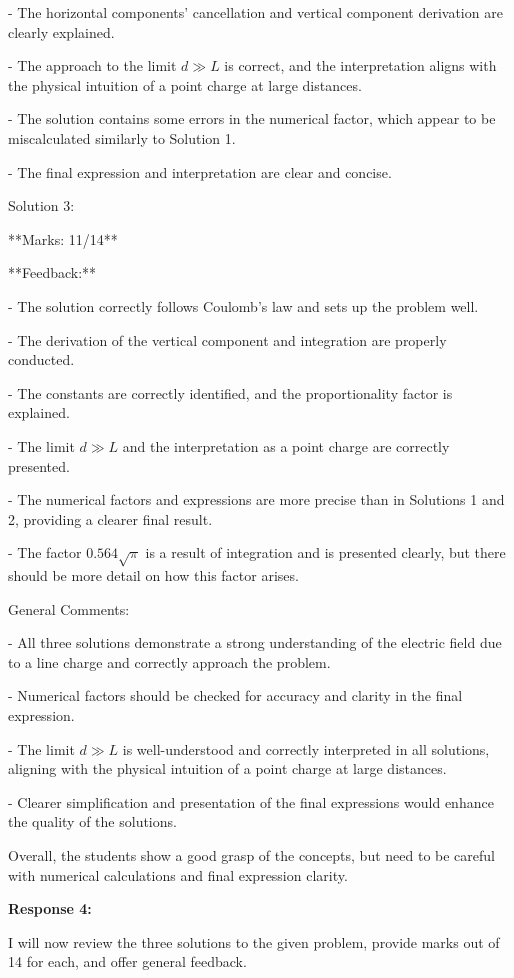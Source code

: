 \documentclass[a4paper,11pt]{article}
\begin{document}
- The horizontal components' cancellation and vertical component derivation are clearly explained.

- The approach to the limit \( d \gg L \) is correct, and the interpretation aligns with the physical intuition of a point charge at large distances.

- The solution contains some errors in the numerical factor, which appear to be miscalculated similarly to Solution 1.

- The final expression and interpretation are clear and concise.

Solution 3:

**Marks: 11/14**

**Feedback:**

- The solution correctly follows Coulomb's law and sets up the problem well.

- The derivation of the vertical component and integration are properly conducted.

- The constants are correctly identified, and the proportionality factor is explained.

- The limit \( d \gg L \) and the interpretation as a point charge are correctly presented.

- The numerical factors and expressions are more precise than in Solutions 1 and 2, providing a clearer final result.

- The factor \( 0.564 \sqrt{\pi} \) is a result of integration and is presented clearly, but there should be more detail on how this factor arises.

General Comments:

- All three solutions demonstrate a strong understanding of the electric field due to a line charge and correctly approach the problem.

- Numerical factors should be checked for accuracy and clarity in the final expression.

- The limit \( d \gg L \) is well-understood and correctly interpreted in all solutions, aligning with the physical intuition of a point charge at large distances.

- Clearer simplification and presentation of the final expressions would enhance the quality of the solutions.

Overall, the students show a good grasp of the concepts, but need to be careful with numerical calculations and final expression clarity.

\bigskip
\textbf{Response 4:}

I will now review the three solutions to the given problem, provide marks out of 14 for each, and offer general feedback.
\end{document}
